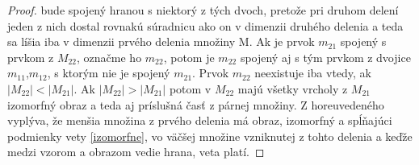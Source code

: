 \begin{proof}
 bude spojený hranou s
niektorý z tých dvoch, pretože pri druhom delení jeden z nich dostal rovnakú
súradnicu ako on v dimenzii druhého delenia a teda sa líšia iba v dimenzii
prvého delenia množiny M. Ak je prvok $m_{21}$ spojený s prvkom z
$M_{22}$, označme ho $m_{22}$, potom je $m_{22}$ spojený aj s tým prvkom
z dvojice $m_{11}$,$m_{12}$, s ktorým nie je spojený $m_{21}$.
Prvok $m_{22}$ neexistuje iba vtedy, ak $|M_{22}|<|M_{21}|$. 
Ak $|M_{22}|>|M_{21}|$ potom v $M_{22}$ majú všetky vrcholy z $M_{21}$
izomorfný obraz a teda aj príslušná časť z párnej množiny.
Z horeuvedeného vyplýva, že menšia množina z prvého delenia má obraz,
izomorfný a spĺňajúci podmienky vety \ref{izomorfne}, 
vo väčšej množine vzniknutej z tohto delenia a keďže 
medzi vzorom a obrazom vedie hrana, veta platí.
\end{proof}

